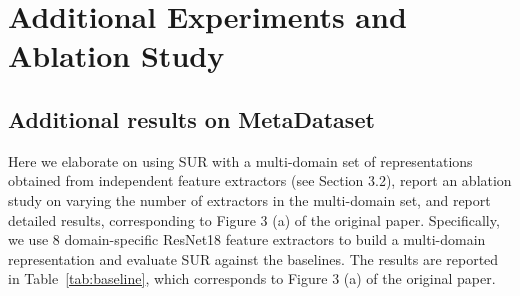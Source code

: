 \documentclass[runningheads]{llncs}
\newcommand\bb[1]{\textbf{#1}}
\begin{document}
\begin{table}[t!] 
\begin{center}
\small\addtolength{\tabcolsep}{-10pt}
\renewcommand{\arraystretch}{1.0}
\renewcommand{\tabcolsep}{1.6mm}
\end{center}
\caption{\bb{Training hyper-parameters of the parametric network family on
    MetaDataset}. The first column indicates the dataset used for training. The
  first row gives the name of he hyper-parameter. The body of the table contains
  hyper-parameters that produced the most accurate model on the validation set.}
\label{tab:metadataset_pf_hyper}
\end{table}



\section{Additional Experiments and Ablation Study}
\subsection{Additional results on MetaDataset}
Here we elaborate on using SUR with a multi-domain set of representations obtained from independent
feature extractors (see Section 3.2), report an ablation study on varying the
number of extractors in the multi-domain set, and report detailed results,
corresponding to Figure 3 (a) of the original paper. Specifically, 
we use 8 domain-specific ResNet18 feature extractors to build a multi-domain
representation and evaluate SUR against the baselines. The results are reported
in Table~\ref{tab:baseline}, which corresponds to Figure 3 (a) of the original
paper.
\end{document}
